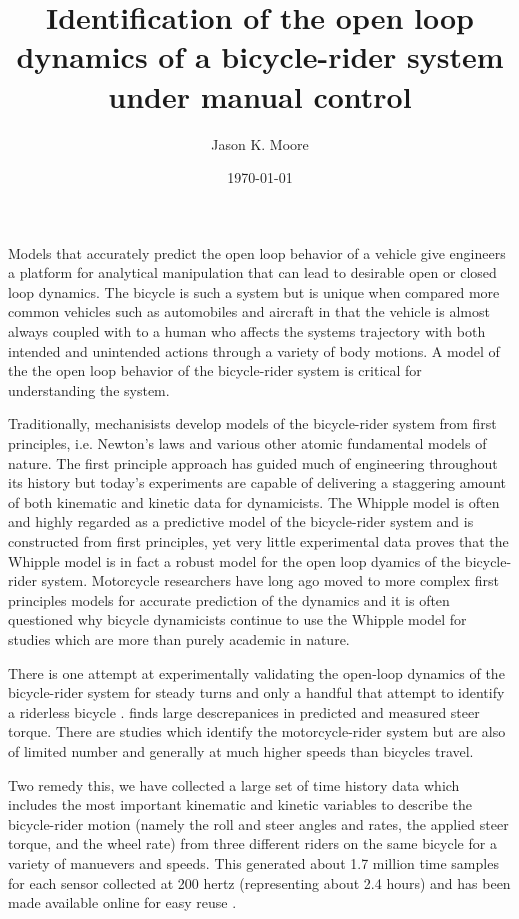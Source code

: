 \documentclass{article}
\title{Identification of the open loop dynamics of a bicycle-rider system
under manual control}
\author{Jason K. Moore}
\date{\today}
\begin{document}
\maketitle

Models that accurately predict the open loop behavior of a vehicle give
engineers a platform for analytical manipulation that can lead to desirable
open or closed loop dynamics. The bicycle is such a system but is unique when
compared more common vehicles such as automobiles and aircraft in that the
vehicle is almost always coupled with to a human who affects the systems
trajectory with both intended and unintended actions through a variety of body
motions. A model of the the open loop behavior of the bicycle-rider system is
critical for understanding the system.

Traditionally, mechanisists develop models of the bicycle-rider system from
first principles, i.e. Newton's laws and various other atomic fundamental
models of nature. The first principle approach has guided much of engineering
throughout its history but today's experiments are capable of delivering a
staggering amount of both kinematic and kinetic data for dynamicists. The
Whipple model \cite{Whipple1899} is often and highly regarded as a predictive
model of the bicycle-rider system and is constructed from first principles, yet
very little experimental data proves that the Whipple model is in fact a robust
model for the open loop dyamics of the bicycle-rider system. Motorcycle
researchers have long ago moved to more complex first principles models for
accurate prediction of the dynamics \cite{Sharp1971} and it is often questioned
why bicycle dynamicists continue to use the Whipple model for studies which are
more than purely academic in nature.

There is one attempt at experimentally validating the open-loop dynamics of the
bicycle-rider system for steady turns \cite{Cain2012} and only a handful that
attempt to identify a riderless bicycle
\cite{Kooijman2006,Kooijman2008,Kooijman2009,Stevens2009,Escalona2011,Kooijman2011}.
\cite{Cain2012} finds large descrepanices in predicted and measured steer
torque.  There are studies which identify the motorcycle-rider system but are
also of limited number and generally at much higher speeds than bicycles
travel.

Two remedy this, we have collected a large set of time history data which
includes the most important kinematic and kinetic variables to describe the
bicycle-rider motion (namely the roll and steer angles and rates, the applied
steer torque, and the wheel rate) from three different riders on the same
bicycle for a variety of manuevers and speeds. This generated about 1.7 million
time samples for each sensor collected at 200 hertz (representing about 2.4
hours) and has been made available online for easy reuse \cite{data}.
\end{document}
